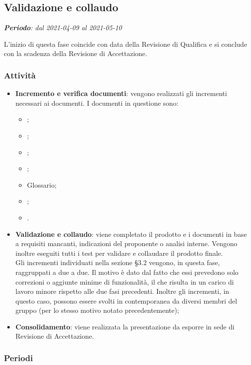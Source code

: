 \subsection{Validazione e collaudo}
\textit{\textbf{Periodo}: dal 2021-04-09 al 2021-05-10}

L'inizio di questa fase coincide con data della Revisione di Qualifica e si conclude con la scadenza della Revisione di Accettazione.

\subsubsection{Attività}

\begin{itemize}
\item \textbf{Incremento e verifica documenti}: vengono realizzati gli incrementi necessari ai documenti. I documenti in questione sono:
\begin{itemize}
\item \NdP{};
\item \AdR{};
\item \PdQ{};
\item \PdP{};
\item Glossario;
\item \MU{};
\item \MM{}.
\end{itemize}
\item \textbf{Validazione e collaudo}: viene completato il prodotto e i documenti in base a requisiti mancanti, indicazioni del proponente o analisi interne. Vengono inoltre eseguiti tutti i test per validare e collaudare il prodotto finale.\\ Gli incrementi individuati nella sezione \S{3.2} vengono, in questa fase, raggruppati a due a due. Il motivo è dato dal fatto che essi prevedono solo correzioni o aggiunte minime di funzionalità, il che risulta in un carico di lavoro minore rispetto alle due fasi precedenti. Inoltre gli incrementi, in questo caso, possono essere svolti in contemporanea da diversi membri del gruppo (per lo stesso motivo notato precedentemente);
\item \textbf{Consolidamento}: viene realizzata la presentazione da esporre in sede di Revisione di Accettazione.
\end{itemize}

\subsubsection{Periodi}


